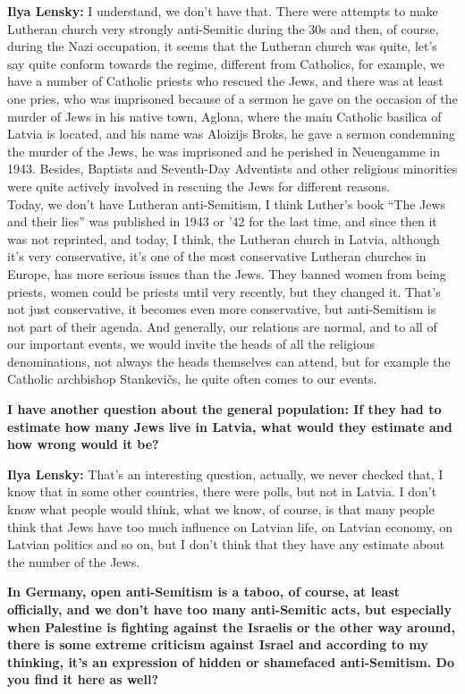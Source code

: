 \textbf{Ilya Lensky:} I understand, we don’t have that. There were attempts to make Lutheran church very strongly anti-Semitic during the 30s and then, of course, during the Nazi occupation, it seems that the Lutheran church was quite, let’s say quite conform towards the regime, different from Catholics, for example, we have a number of Catholic priests who rescued the Jews, and there was at least one pries, who was imprisoned because of a sermon he gave on the  occasion of the murder of Jews in his native town, Aglona, where the main Catholic basilica of Latvia is located, and his name was Aloizijs Broks, he gave a sermon condemning the murder of the Jews, he was imprisoned and he perished in Neuengamme in 1943. Besides, Baptists and Seventh-Day Adventists and other religious minorities were quite actively involved in rescuing the Jews for different reasons. \\
Today, we don’t have Lutheran anti-Semitism, I think Luther’s book ``The Jews and their lies” was published in 1943 or '42 for the last time, and since then it was not reprinted, and today, I think, the Lutheran church in Latvia, although it’s very conservative, it’s one of the most conservative Lutheran churches in Europe, has more serious issues than the Jews. They banned women from being priests, women could be priests until very recently, but they changed it. That’s not just conservative, it becomes even more conservative, but anti-Semitism is not part of their agenda. And generally, our relations are normal, and to all of our important events, we would invite the heads of all the religious denominations, not always the heads themselves can attend, but for example the Catholic archbishop Stankevičs, he quite often comes to our events. 

\textbf{I have another question about the general population: If they had to estimate how many Jews live in Latvia, what would they estimate and how wrong would it be?}

\textbf{Ilya Lensky:} That’s an interesting question, actually, we never checked that, I know that in some other countries, there were polls, but not in Latvia. I don’t know what people would think, what we know, of course, is that many people think that Jews have too much influence on Latvian life, on Latvian economy, on Latvian politics and so on, but I don’t think that they have any estimate about the number of the Jews. 

\textbf{In Germany, open anti-Semitism is a taboo, of course, at least officially, and we don’t have too many anti-Semitic acts, but especially when Palestine is fighting against the Israelis or the other way around, there is some extreme criticism against Israel and according to my thinking, it’s an expression of hidden or shamefaced anti-Semitism. Do you find it here as well?}

